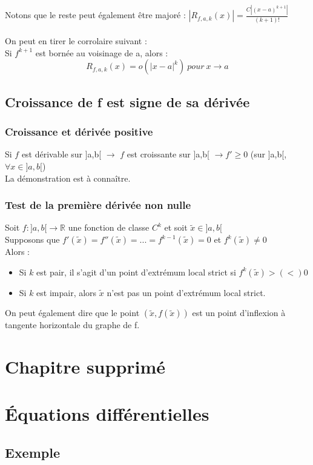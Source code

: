 \documentclass	[11pt, a4paper, openany]{book}
\begin{document}
Notons que le reste peut également être majoré : $|R_{f, a, k}(x)| = \frac{C|(x-a)^{k+1}|}{(k+1)!}$\\\\
On peut en tirer le corrolaire suivant : \\
Si $f^{k+1}$  est bornée au voisinage de a, alors : 
$$R_{f, a, k}(x) = o(|x-a|^{k})\ pour\ x \rightarrow a $$

\section{Croissance de f est signe de sa dérivée}
\subsection{Croissance et dérivée positive}
Si $f$ est dérivable sur ]a,b[ $\rightarrow$ $f$ est croissante sur ]a,b[ $\rightarrow f' \geq 0$ (sur ]a,b[, $\forall x \in ]a,b[$)\\
La démonstration est à connaître.

\subsection{Test de la première dérivée non nulle}
Soit $f:]a,b[ \rightarrow \mathbb{R}$ une fonction de classe $C^{k}$ et soit $\tilde{x} \in ]a,b[$\\
Supposons que $f'(\tilde{x}) = f''(\tilde{x}) = ... = f^{k-1}(\tilde{x}) = 0 $ et $f^{k}(\tilde{x}) \neq 0$\\ Alors : 
\begin{itemize}
\item Si $k$ est pair, il s'agit d'un point d'extrémum local strict si $f^{k}(\tilde{x}) >(<) 0 $
\item Si $k$ est impair, alors $\tilde{x}$ n'est pas un point d'extrémum local strict.
\end{itemize}
On peut également dire que le point $(\tilde{x}, f(\tilde{x}))$ est un point d'inflexion à tangente horizontale du graphe de f.


\chapter{Chapitre supprimé}
\chapter{Équations différentielles}
\section{Exemple}
\end{document}
